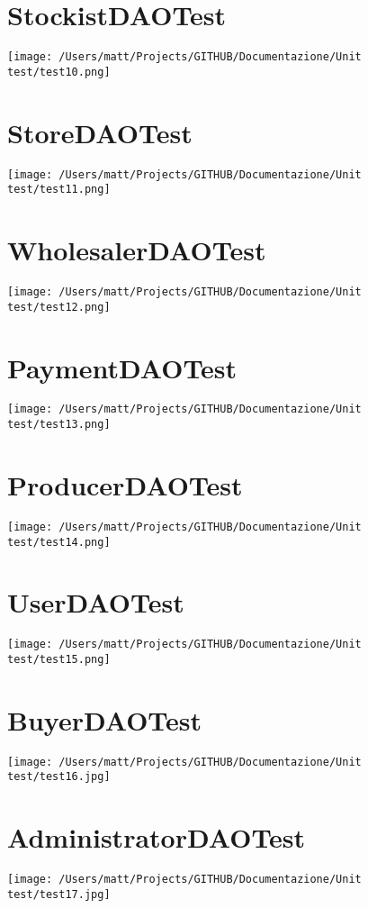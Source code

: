 \section{StockistDAOTest}
\texttt{[image: /Users/matt/Projects/GITHUB/Documentazione/Unit test/test10.png]}

\section{StoreDAOTest}
\texttt{[image: /Users/matt/Projects/GITHUB/Documentazione/Unit test/test11.png]}

\section{WholesalerDAOTest}
\texttt{[image: /Users/matt/Projects/GITHUB/Documentazione/Unit test/test12.png]}

\section{PaymentDAOTest}
\texttt{[image: /Users/matt/Projects/GITHUB/Documentazione/Unit test/test13.png]}

\section{ProducerDAOTest}
\texttt{[image: /Users/matt/Projects/GITHUB/Documentazione/Unit test/test14.png]}

\section{UserDAOTest}
\texttt{[image: /Users/matt/Projects/GITHUB/Documentazione/Unit test/test15.png]}

\section{BuyerDAOTest}
\texttt{[image: /Users/matt/Projects/GITHUB/Documentazione/Unit test/test16.jpg]}

\section{AdministratorDAOTest}
\texttt{[image: /Users/matt/Projects/GITHUB/Documentazione/Unit test/test17.jpg]}

